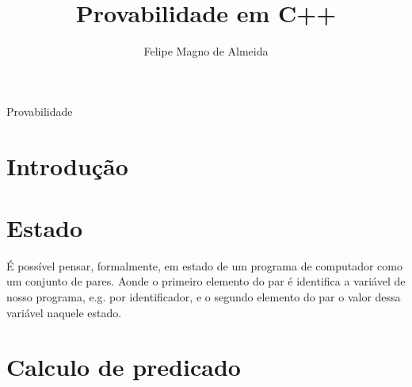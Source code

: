 \documentclass[12pt]{article}
\title{Provabilidade em C++}
\author{Felipe Magno de Almeida}
\begin{document}
 

\maketitle
     
\begin{resumo} 

  Provabilidade

\end{resumo}

\section{Introdução}

\section{Estado}

É possível pensar, formalmente, em estado de um programa de computador
como um conjunto de pares. Aonde o primeiro elemento do par é
identifica a variável de nosso programa, e.g. por identificador, e o
segundo elemento do par o valor dessa variável naquele estado.



\section{Calculo de predicado}
\end{document}
